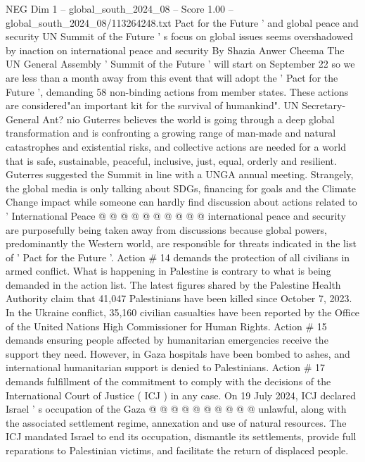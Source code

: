 \begin{textsample}{NEG Dim 1 – global\_south\_2024\_08 – Score 1.00 – global\_south\_2024\_08/113264248.txt}  \label{ex:f1_neg_439}
Pact for the Future ' and global peace and security UN Summit of the Future ' s focus on global issues seems overshadowed by inaction on international peace and security By Shazia Anwer Cheema The UN General Assembly ' Summit of the Future ' will start on September 22 so we are less than a month away from this event that will adopt the ' Pact for the Future ', demanding 58 non-binding actions from member states.
These actions are considered"an important kit for the survival of humankind".
UN Secretary-General Ant? nio Guterres believes the world is going through a deep global transformation and is confronting a growing range of man-made and natural catastrophes and existential risks, and collective actions are needed for a world that is safe, sustainable, peaceful, inclusive, just, equal, orderly and resilient.
Guterres suggested the Summit in line with a UNGA annual meeting.
Strangely, the global media is only talking about SDGs, financing for goals and the Climate Change impact while someone can hardly find discussion about actions related to ' International Peace @ @ @ @ @ @ @ @ @ @ international peace and security are purposefully being taken away from discussions because global powers, predominantly the Western world, are responsible for threats indicated in the list of ' Pact for the Future '.
Action \# 14 demands the protection of all civilians in armed conflict.
What is happening in Palestine is contrary to what is being demanded in the action list.
The latest figures shared by the Palestine Health Authority claim that 41,047 Palestinians have been killed since October 7, 2023.
In the Ukraine conflict, 35,160 civilian casualties have been reported by the Office of the United Nations High Commissioner for Human Rights.
Action \# 15 demands ensuring people affected by humanitarian emergencies receive the support they need.
However, in Gaza hospitals have been bombed to ashes, and international humanitarian support is denied to Palestinians.
Action \# 17 demands fulfillment of the commitment to comply with the decisions of the International Court of Justice ( ICJ ) in any case.
On 19 July 2024, ICJ declared Israel ' s occupation of the Gaza @ @ @ @ @ @ @ @ @ @ unlawful, along with the associated settlement regime, annexation and use of natural resources.
The ICJ mandated Israel to end its occupation, dismantle its settlements, provide full reparations to Palestinian victims, and facilitate the return of displaced people.

\end{textsample}
